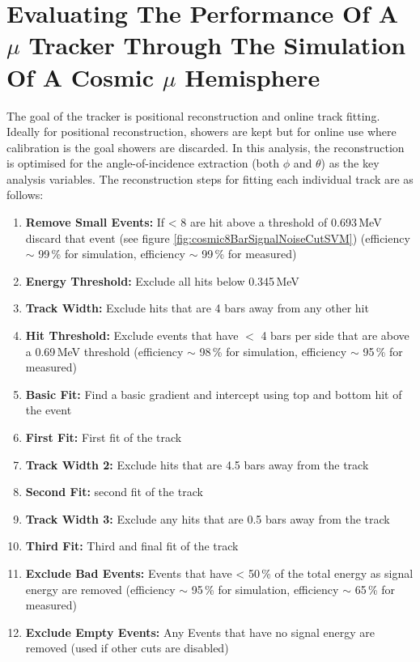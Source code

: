 \section{Evaluating The Performance Of A $\mu$ Tracker Through The Simulation Of A Cosmic $\mu$ Hemisphere}\label{sec:SimulationOfCosmics}
The goal of the tracker is positional reconstruction and online track fitting. Ideally for positional reconstruction, showers are kept but for online use where calibration is the goal showers are discarded. In this analysis, the reconstruction is optimised for the angle-of-incidence extraction (both $\phi$ and $\theta$) as the key analysis variables. The reconstruction steps for fitting each individual track are as follows: 
\begin{enumerate}
  \item \textbf{Remove Small Events:} If < 8 are hit above a threshold of 0.693\,MeV discard that event (see figure \ref{fig:cosmic8BarSignalNoiseCutSVM}) (efficiency $\sim$ 99\,\% for simulation, efficiency $\sim$ 99\,\% for measured)
  \item \textbf{Energy Threshold:} Exclude all hits below 0.345\,MeV
  \item \textbf{Track Width:} Exclude hits that are 4 bars away from any other hit 
  \item \textbf{Hit Threshold:} Exclude events that have $<$ 4 bars per side that are above a 0.69\,MeV threshold (efficiency $\sim$ 98\,\% for simulation, efficiency $\sim$ 95\,\% for measured)
  \item \textbf{Basic Fit:} Find a basic gradient and intercept using top and bottom hit of the event
  \item \textbf{First Fit:} First fit of the track 
  \item \textbf{Track Width 2:} Exclude hits that are 4.5 bars away from the track
  \item \textbf{Second Fit:} second fit of the track
  \item \textbf{Track Width 3:} Exclude any hits that are 0.5 bars away from the track
  \item \textbf{Third Fit:} Third and final fit of the track
  \item \textbf{Exclude Bad Events:} Events that have < 50\,\% of the total energy as signal energy are removed (efficiency $\sim$ 95\,\% for simulation, efficiency $\sim$ 65\,\% for measured)
  \item \textbf{Exclude Empty Events:} Any Events that have no signal energy are removed (used if other cuts are disabled) 
\end{enumerate}
